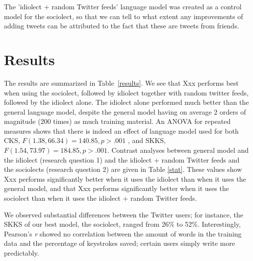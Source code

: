 \documentclass[11pt]{article}
\begin{document}
The 'idiolect $+$ random Twitter feeds' language model was created as a control model for the sociolect, so that we can tell to what extent any improvements of adding tweets can be attributed to the fact that these are tweets from friends.

\section{Results}

The results are summarized in Table~\ref{results}. We see that Xxx performs best when using the sociolect, followed by idiolect together with random twitter feeds, followed by the idiolect alone. The idiolect alone performed much better than the general language model, despite the general model having on average 2 orders of magnitude (200 times) as much training material. An ANOVA for repeated measures shows that there is indeed an effect of language model used for both CKS, $F(1.38,66.34) = 140.85, p > .001$ , and SKKS, $F(1.54,73.97) = 184.85, p > .001$. Contrast analyses between general model and the idiolect (research question 1) and the idiolect + random Twitter feeds and the sociolects (research question 2) are given in Table \ref{stat}. These values show Xxx performs significantly better when it uses the idiolect than when it uses the general model, and that Xxx performs significantly better when it uses the sociolect than when it uses the idiolect + random Twitter feeds.


We observed substantial differences between the Twitter users; for instance, the SKKS of our best model, the sociolect, ranged from 26\% to 52\%. Interestingly, Pearson's \emph{r} showed no correlation between the amount of words in the training data and the percentage of keystrokes saved; certain users simply write more predictably.
\end{document}
